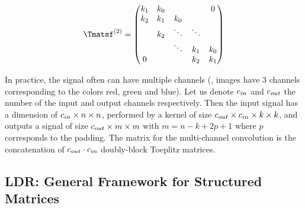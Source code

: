 \begin{equation*}
  \Tmatsf^{(2)} = \leftmatrix
    k_1 & k_0 &         &         & 0       \\
    k_2 & k_1 & k_0 &         &         \\
            & k_2 & \ddots  & \ddots  &         \\
            &         & \ddots  & k_1 & k_0 \\
    0       &         &         & k_2 & k_1 \\
  \rightmatrix
\end{equation*}


In practice, the signal often can have multiple channels (\eg, images have 3 channels corresponding to the colors red, green and blue).
Let us denote $c_{in}$ and $c_{out}$ the number of the input and output channels respectively.
Then the input signal has a dimension of $c_{in} \times n \times n$, performed by a kernel of size $c_{out} \times c_{in} \times k \times k$, and outputs a signal of size $c_{out} \times m \times m$ with $m = n - k + 2p + 1$ where $p$ corresponds to the padding.
The matrix for the multi-channel convolution is the concatenation of $c_{out} \cdot c_{in}$ doubly-block Toeplitz matrices.



\subsection{LDR: General Framework for Structured Matrices}
\label{subsection:ch2-general_frameworks_for_structured_matrices}




